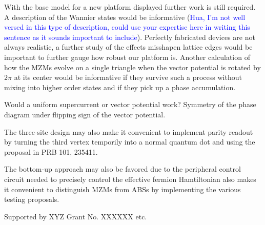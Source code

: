 \documentclass[aps,prb,showpacs,amsmath,twocolumn,amssymb,superscriptaddress]{revtex4-2}
\newcommand{\Blue}[1]{\textcolor{blue}{#1}}
\begin{document}
With the base model for a new platform displayed further work is still required.
A description of the Wannier states would be informative (\Blue{Hua, I'm not well versed in this type of description, could use your expertise here in writing this sentence as it sounds important to include}).
Perfectly fabricated devices are not always realistic, a further study of the effects misshapen lattice edges would be important to further gauge how robust our platform is.
Another calculation of how the MZMs evolve on a single triangle when the vector potential is rotated by $2\pi$ at its center would be informative if they survive such a process without mixing into higher order states and if they pick up a phase accumulation.

Would a uniform supercurrent or vector potential work?  Symmetry of the phase diagram under flipping sign of the vector potential. 

The three-site design may also make it convenient to implement parity readout by turning the third vertex temporily into a normal quantum dot and using the proposal in PRB 101, 235411. 

The bottom-up approach may also be favored due to the peripheral control circuit needed to precisely control the effective fermion Hamtiltonian also makes it convenient to distinguish MZMs from ABSs by implementing the various testing proposals.

\begin{acknowledgements}
  Supported by XYZ Grant No. XXXXXX etc.
\end{acknowledgements}



\end{document}
